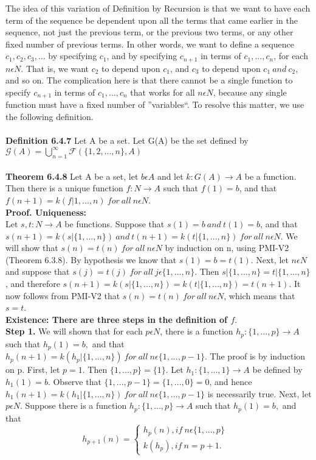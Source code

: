 \documentclass[a4paper,english,12pt]{article}
\begin{document}
    The idea of this variation of Definition by Recursion is that we want to have each term of the sequence be dependent upon all the 
terms that came earlier in the sequence, not just the previous term, or the previous two terms, or any other fixed number of previous terms. In other words, we want to define a sequence $c_1, c_2, c_3, . . .$ by specifying $c_1$, and by specifying $c_{n+1}$ in terms of $c_1, . . ., c_n$, for each $n\epsilon N$. That is, we want $c_2$ to depend upon $c_1$, and $c_3$ to depend upon $c_1~ and~ c_2$, and so on. The complication here is that there cannot be a single function to specify $c_{n+1}$ in terms of $c_1, . . ., c_n$ that works for all $n\epsilon N$, because any single function must have a fixed number of ''variables``. To resolve this matter, we use the following definition.
\\\\
{\bf Definition 6.4.7} Let A be a set. Let G(A) be the set defined by\\
$\mathscr{G}(A)=\bigcup_{n=1}^{\infty}\mathscr{F}(\{1, 2, . . ., n\}, A)$\\\\
{\bf Theorem 6.4.8} Let A be a set, let $b\epsilon A$ and let $k : G(A)\rightarrow A$ be a function. Then there is a unique function 
$f : N\rightarrow A$ such that $f(1)=b$, and that $f (n + 1) = k( f|{1,...,n} )~ for~ all~ n\epsilon N$.
\\
{\bf Proof. Uniqueness:}\\
Let $s,t : N\rightarrow A$ be functions. Suppose that $s(1) = b~ and~ t(1) = b$, and that $s(n + 1) = k(s|\{1,...,n\})~ and~ t(n + 1) = k(t|\{1,...,n\})~ for~ all~ n\epsilon N$. We will show that $s(n)=t(n)~for~all~n\epsilon N$ by induction on n, using PMI-V2 (Theorem 6.3.8). By hypothesis we know that $s(1) = b = t(1)$. Next, let $n\epsilon N$ and suppose that $s(j) = t(j)~ for~ all~ j\epsilon \{1,. . ., n\}$. Then $s|\{1,...,n\} = t|\{1,...,n\}$, and therefore $s(n + 1) = k(s|\{1,...,n\} ) = k(t|\{1,...,n\}) = t(n + 1)$. It now follows from PMI-V2 that $s(n) = t(n)~ for ~all~ n\epsilon N$, which means that $s = t$. \\{\bf Existence: There are three steps in the definition of $f .$}\\
{\bf Step 1.} We will shown that for each $p\epsilon N$, there is a function $h_p : \{1, . . ., p\}\rightarrow A$ such that $h_p(1)=b,$ and that $h_p(n + 1) = k(h_p |\{1,...,n\})~ for~ all~ n\epsilon \{1, . . ., p − 1\}$. The proof is by induction on p. First, let $p=1.$ Then $\{1, . . ., p\} = \{1\}$. Let $h_1 : \{1, . . .,1\}\rightarrow A$ be defined by $h_1(1) = b$. Observe that $\{1, . . ., p − 1\} = \{1, . . ., 0\} = 0$, and hence $h_1 (n + 1) = k(h_1 |\{1, . . ., n\})~ for~ all~ n\epsilon \{1, . . ., p − 1\}$ is necessarily true. Next, let $p\epsilon N$. Suppose there is a function $h_p : \{1, . . ., p\}\rightarrow A$ such that $h_p(1) = b,$ and that  \begin{equation*}
h_{p+1}(n)= \left\{\begin{matrix}
h_p(n), if~ n\epsilon \{1, . . ., p\} & \\ 
k(h_p), if~ n=p+1.& 
\end{matrix}\right.
\end{equation*}
\end{document}
